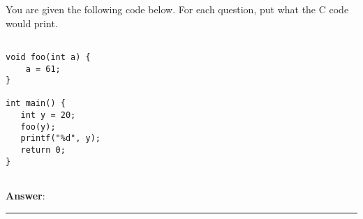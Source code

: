 \question You are given the following code below. For each question, put what the C code would print.

\begin{blocksection}

\begin{verbatim}

void foo(int a) {
    a = 61;
}

int main() {
   int y = 20;
   foo(y);
   printf("%d", y);
   return 0;
}


\end{verbatim}

\end{blocksection}
\textbf{Answer}: \rule{1cm}{0.25mm}